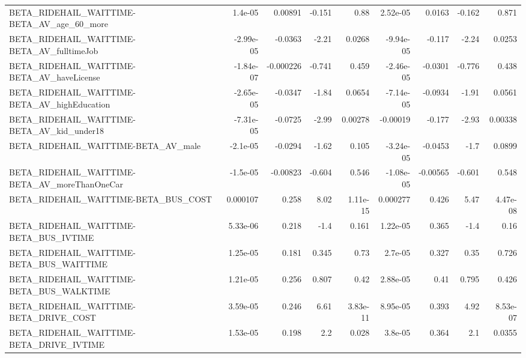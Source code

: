 \begin{tabular}{lrrrrrrrr}
BETA\_RIDEHAIL\_WAITTIME-BETA\_AV\_age\_60\_more         &     1.4e-05 &      0.00891 &   -0.151 &     0.88 &   2.52e-05 &      0.0163 &       -0.162 &         0.871 \\
BETA\_RIDEHAIL\_WAITTIME-BETA\_AV\_fulltimeJob         &   -2.99e-05 &      -0.0363 &    -2.21 &   0.0268 &  -9.94e-05 &      -0.117 &        -2.24 &        0.0253 \\
BETA\_RIDEHAIL\_WAITTIME-BETA\_AV\_haveLicense         &   -1.84e-07 &    -0.000226 &   -0.741 &    0.459 &  -2.46e-05 &     -0.0301 &       -0.776 &         0.438 \\
BETA\_RIDEHAIL\_WAITTIME-BETA\_AV\_highEducation       &   -2.65e-05 &      -0.0347 &    -1.84 &   0.0654 &  -7.14e-05 &     -0.0934 &        -1.91 &        0.0561 \\
BETA\_RIDEHAIL\_WAITTIME-BETA\_AV\_kid\_under18         &   -7.31e-05 &      -0.0725 &    -2.99 &  0.00278 &   -0.00019 &      -0.177 &        -2.93 &       0.00338 \\
BETA\_RIDEHAIL\_WAITTIME-BETA\_AV\_male                &    -2.1e-05 &      -0.0294 &    -1.62 &    0.105 &  -3.24e-05 &     -0.0453 &         -1.7 &        0.0899 \\
BETA\_RIDEHAIL\_WAITTIME-BETA\_AV\_moreThanOneCar      &    -1.5e-05 &     -0.00823 &   -0.604 &    0.546 &  -1.08e-05 &    -0.00565 &       -0.601 &         0.548 \\
BETA\_RIDEHAIL\_WAITTIME-BETA\_BUS\_COST               &    0.000107 &        0.258 &     8.02 & 1.11e-15 &   0.000277 &       0.426 &         5.47 &      4.47e-08 \\
BETA\_RIDEHAIL\_WAITTIME-BETA\_BUS\_IVTIME             &    5.33e-06 &        0.218 &     -1.4 &    0.161 &   1.22e-05 &       0.365 &         -1.4 &          0.16 \\
BETA\_RIDEHAIL\_WAITTIME-BETA\_BUS\_WAITTIME           &    1.25e-05 &        0.181 &    0.345 &     0.73 &    2.7e-05 &       0.327 &         0.35 &         0.726 \\
BETA\_RIDEHAIL\_WAITTIME-BETA\_BUS\_WALKTIME           &    1.21e-05 &        0.256 &    0.807 &     0.42 &   2.88e-05 &        0.41 &        0.795 &         0.426 \\
BETA\_RIDEHAIL\_WAITTIME-BETA\_DRIVE\_COST             &    3.59e-05 &        0.246 &     6.61 & 3.83e-11 &   8.95e-05 &       0.393 &         4.92 &      8.53e-07 \\
BETA\_RIDEHAIL\_WAITTIME-BETA\_DRIVE\_IVTIME           &    1.53e-05 &        0.198 &      2.2 &    0.028 &    3.8e-05 &       0.364 &          2.1 &        0.0355 \\

\end{tabular}
